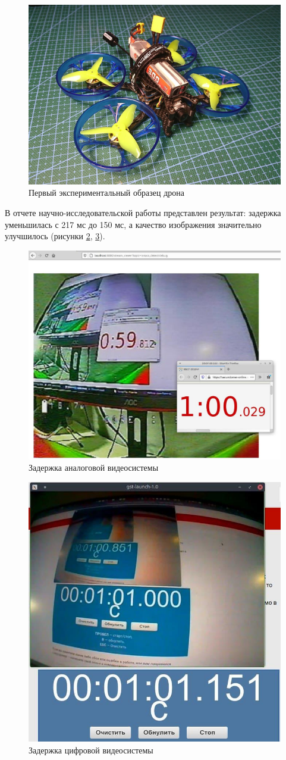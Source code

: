 \begin{figure}[H]
	\centering
	\includegraphics[width=0.5\linewidth]{../RW/pics/quad2}
	\caption{Первый экспериментальный образец дрона
	}
	\label{fig:drone} %
\end{figure}

В отчете научно-исследовательской работы \cite{nir2} представлен результат: задержка уменьшилась с 217 мс до 150 мс, а качество изображения значительно улучшилось (рисунки \ref{fig:time}, \ref{fig:zadergka}).

\begin{figure}[H]
	\centering
	\includegraphics[width=0.5\linewidth]{../RW/pics/time}
	\caption{Задержка аналоговой видеосистемы
	}
	\label{fig:time} %
\end{figure}

\begin{figure}[H]
	\centering
	\includegraphics[width=0.5\linewidth]{./pics/time}
	\caption{Задержка цифровой видеосистемы
	}
	\label{fig:zadergka} %
\end{figure}

